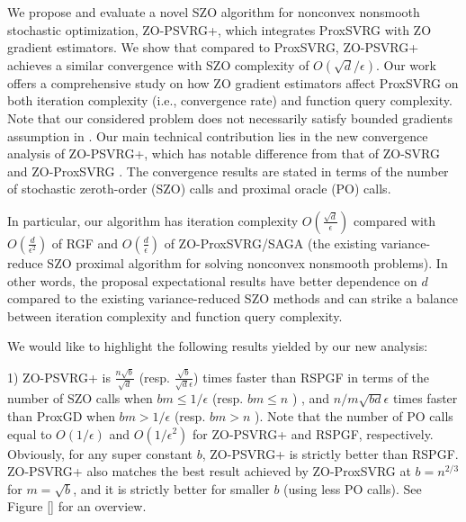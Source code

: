\documentclass{article}
\theoremstyle{definition}
\theoremstyle{remark}
\begin{document}
{\color{Green}

 
{\color{Brown}
We propose and evaluate a novel SZO algorithm for nonconvex nonsmooth stochastic optimization,
ZO-PSVRG+, which integrates ProxSVRG with ZO gradient estimators. We show that compared to
ProxSVRG, ZO-PSVRG+ achieves a similar convergence with SZO complexity of $O(\sqrt{d}/\epsilon)$. Our work offers a comprehensive study on how ZO gradient estimators affect ProxSVRG on both iteration complexity (i.e., convergence rate) and function query complexity. Note that our considered problem does
not necessarily satisfy bounded gradients assumption in \cite{ghadimi2016accelerated,huang2019faster}.
} 
{\color{Violet}
Our main technical contribution lies in the new convergence analysis of ZO-PSVRG+,
which has notable difference from that of ZO-SVRG \cite{liu2018zeroth} and ZO-ProxSVRG \cite{huang2019faster}. The convergence results are stated in terms of the number of stochastic zeroth-order (SZO) calls and proximal
oracle (PO) calls. 
} 
 
In particular, our algorithm has iteration complexity $O(\frac{\sqrt{d}}{{\epsilon}})$ compared with $O(\frac{d}{\epsilon^2})$ of RGF \cite{ghadimi2016accelerated}  and $O(\frac{d}{\epsilon})$ of ZO-ProxSVRG/SAGA  \cite{huang2019faster} (the existing variance-reduce SZO proximal algorithm for solving nonconvex nonsmooth problems).  
{\color{RubineRed}In other words, the proposal expectational results have better dependence on
$d$ compared to the existing variance-reduced SZO methods and {\color{Brown}
 can strike a balance between iteration complexity and function query complexity.}} 
 

{\color{Violet}
We would like to highlight the following results yielded by our new analysis:

1) ZO-PSVRG+ is $\frac{n\sqrt{b}}{\sqrt{d}}$ (resp. $\frac{\sqrt{b}}{\sqrt{d}\epsilon}$) times faster than RSPGF in terms of the number of SZO calls when $bm\leq 1/\epsilon$ (resp. $bm \leq n$ ){\color{red} , and $n/m\sqrt{bd}\epsilon$ times faster than ProxGD when $bm > 1/\epsilon$ (resp. $bm > n$ )}. Note that the number of PO calls equal to $O(1/\epsilon)$  and $O(1/\epsilon^2)$ for ZO-PSVRG+ and RSPGF, respectively. Obviously, for any super constant $b$, ZO-PSVRG+ is strictly better than RSPGF. ZO-PSVRG+ also matches the best result achieved by ZO-ProxSVRG {\color{red} at $b = n^{2/3}$ for $m = \sqrt{b}$, and it is strictly better for smaller $b$ (using less PO calls).} See Figure \ref{} for an overview.
}

}
\end{document}
